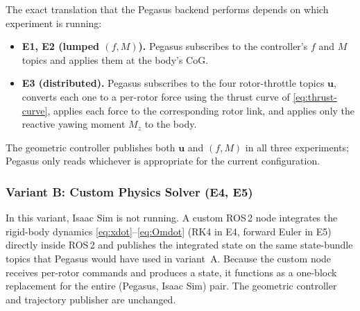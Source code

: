 \documentclass[11pt]{article}
\theoremstyle{remark}
\begin{document}
The exact translation that the Pegasus backend performs depends on which experiment is running:

\begin{itemize}
    \item \textbf{E1, E2 (lumped $(f,M)$).} Pegasus subscribes to the controller's $f$ and $M$ topics and applies them at the body's CoG.
    \item \textbf{E3 (distributed).} Pegasus subscribes to the four rotor-throttle topics $\mathbf{u}$, converts each one to a per-rotor force using the thrust curve of \eqref{eq:thrust-curve}, applies each force to the corresponding rotor link, and applies only the reactive yawing moment $M_z$ to the body.
\end{itemize}

The geometric controller publishes both $\mathbf{u}$ and $(f, M)$ in all three experiments; Pegasus only reads whichever is appropriate for the current configuration.

\subsubsection{Variant B: Custom Physics Solver (E4, E5)}

In this variant, Isaac Sim is not running. A custom ROS\,2 node integrates the rigid-body dynamics \eqref{eq:xdot}--\eqref{eq:Omdot} (RK4 in E4, forward Euler in E5) directly inside ROS\,2 and publishes the integrated state on the same state-bundle topics that Pegasus would have used in variant~A. Because the custom node receives per-rotor commands and produces a state, it functions as a one-block replacement for the entire (Pegasus, Isaac Sim) pair. The geometric controller and trajectory publisher are unchanged.
\end{document}
